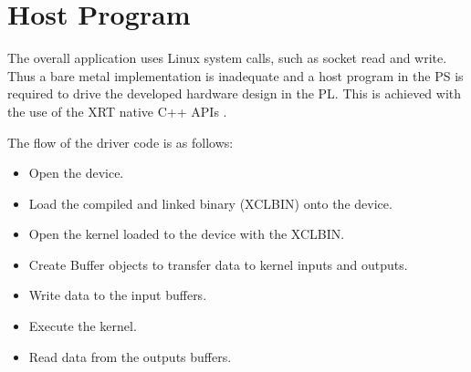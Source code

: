 \section{Host Program}
The overall application uses Linux system calls, such as socket read and write. Thus a bare metal implementation is inadequate and a host program in the PS is required to drive the developed hardware design in the PL. This is achieved with the use of the XRT native C++ APIs \cite{XRT_Native_APIs}.

The flow of the driver code is as follows:
\begin{itemize}
    \item Open the device.
    \item Load the compiled and linked binary (XCLBIN) onto the device.
    \item Open the kernel loaded to the device with the XCLBIN.
    \item Create Buffer objects to transfer data to kernel inputs and outputs.
    \item Write data to the input buffers.
    \item Execute the kernel.
    \item Read data from the outputs buffers.
\end{itemize}
